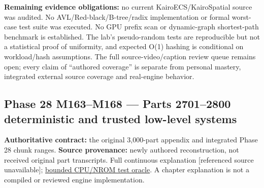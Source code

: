 \textbf{Remaining evidence obligations:} no current KairoECS/KairoSpatial source was audited. No AVL/Red-black/B-tree/radix implementation or formal worst-case test suite was executed. No GPU prefix scan or dynamic-graph shortest-path benchmark is established. The lab's pseudo-random tests are reproducible but not a statistical proof of uniformity, and expected O(1) hashing is conditional on workload/hash assumptions. The full source-video/caption review queue remains open; every claim of ``authored coverage'' is separate from personal mastery, integrated external source coverage and real-engine behavior.

\subsection{Phase 28 M163--M168 --- Parts 2701--2800 deterministic and trusted low-level systems}\label{appendix-fd090d982a15-phase-28-m163m168-parts-27012800-deterministic-and-trusted-low-level-systems}

\textbf{Authoritative contract:} the original 3,000-part appendix and integrated Phase 28 chunk ranges. \textbf{Source provenance:} newly authored reconstruction, not received original part transcripts. {Full continuous explanation {[}referenced source unavailable{]}}; \hyperref[source-file-552a9e2296dc984412c8f06d]{bounded CPU/NROM test oracle}. A chapter explanation is not a compiled or reviewed engine implementation.


